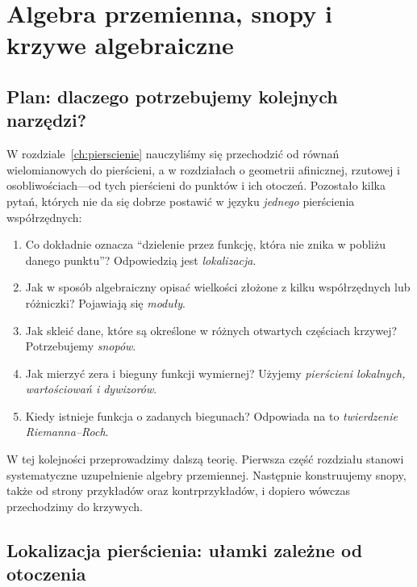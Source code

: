 \documentclass[11pt,a4paper,openany]{report}
\numberwithin{equation}{section}
\theoremstyle{plain}
\theoremstyle{definition}
\theoremstyle{remark}
\begin{document}
\chapter{Algebra przemienna, snopy i krzywe algebraiczne}
\label{ch:krzywe-snopy}

\section{Plan: dlaczego potrzebujemy kolejnych narzędzi?}
\label{sec:plan-krzywe}
W rozdziale~\ref{ch:pierscienie} nauczyliśmy się przechodzić od równań
wielomianowych do pierścieni, a w rozdziałach o geometrii afinicznej,
rzutowej i osobliwościach---od tych pierścieni do punktów i ich
otoczeń. Pozostało kilka pytań, których nie da się dobrze postawić
w języku \emph{jednego} pierścienia współrzędnych:
\begin{enumerate}[label=\arabic*)]
\item Co dokładnie oznacza ``dzielenie przez funkcję, która nie znika
w pobliżu danego punktu''? Odpowiedzią jest \emph{lokalizacja}.
\item Jak w sposób algebraiczny opisać wielkości złożone z kilku
współrzędnych lub różniczki? Pojawiają się \emph{moduły}.
\item Jak skleić dane, które są określone w różnych otwartych częściach
krzywej? Potrzebujemy \emph{snopów}.
\item Jak mierzyć zera i bieguny funkcji wymiernej? Użyjemy
\emph{pierścieni lokalnych, wartościowań i dywizorów}.
\item Kiedy istnieje funkcja o zadanych biegunach? Odpowiada na to
\emph{twierdzenie Riemanna--Roch}.
\end{enumerate}
W tej kolejności przeprowadzimy dalszą teorię. Pierwsza część
rozdziału stanowi systematyczne uzupełnienie algebry przemiennej.
Następnie konstruujemy snopy, także od strony przykładów oraz
kontrprzykładów, i dopiero wówczas przechodzimy do krzywych.

\section{Lokalizacja pierścienia: ułamki zależne od otoczenia}
\label{sec:lokalizacja}
\end{document}
